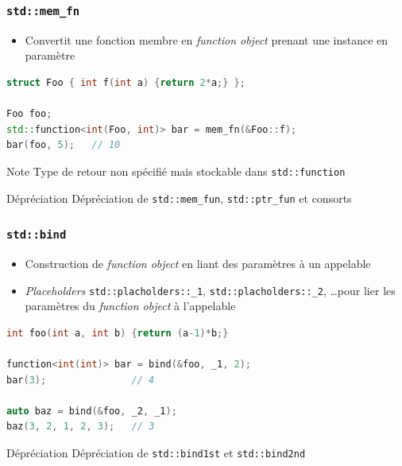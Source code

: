 \documentclass[C++.tex]{subfiles}
\begin{document}
\begin{frame}[fragile]
	\frametitle{\lstinline|std::mem_fn|}
	\begin{itemize}
		\item Convertit une fonction membre en \textit{function object} prenant une instance en paramètre
	\end{itemize}

	\begin{lstlisting}[language=C++]
struct Foo { int f(int a) {return 2*a;} };

Foo foo;
std::function<int(Foo, int)> bar = mem_fn(&Foo::f);
bar(foo, 5);   // 10\end{lstlisting}

	\begin{block}{Note}
		Type de retour non spécifié mais stockable dans \lstinline|std::function|
	\end{block}

	\begin{block}{Dépréciation}
		Dépréciation de \lstinline|std::mem_fun|, \lstinline|std::ptr_fun| et consorts

	\end{block}
\end{frame}

\begin{frame}[fragile]
	\frametitle{\lstinline|std::bind|}
	\begin{itemize}
		\item Construction de \textit{function object} en liant des paramètres à un appelable
		\item \textit{Placeholders} \lstinline|std::placholders::_1|, \lstinline|std::placholders::_2|, \ldots pour lier les paramètres du \textit{function object} à l'appelable
	\end{itemize}

	\begin{lstlisting}[language=C++]
int foo(int a, int b) {return (a-1)*b;}

function<int(int)> bar = bind(&foo, _1, 2);
bar(3);               // 4

auto baz = bind(&foo, _2, _1);
baz(3, 2, 1, 2, 3);   // 3\end{lstlisting}	


	\begin{block}{Dépréciation}
		Dépréciation de \lstinline|std::bind1st| et \lstinline|std::bind2nd|

	\end{block}
\end{frame}
\end{document}
